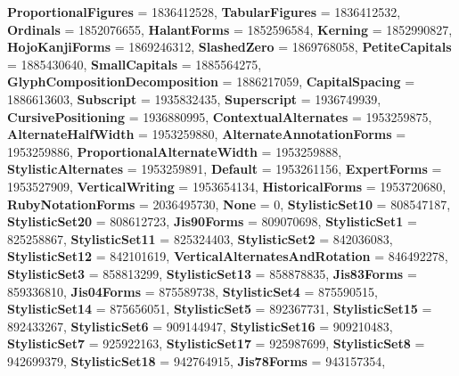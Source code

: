 \begin{DoxyCompactItemize}
{\bfseries Proportional\+Figures} = 1836412528, 
{\bfseries Tabular\+Figures} = 1836412532, 
{\bfseries Ordinals} = 1852076655, 
{\bfseries Halant\+Forms} = 1852596584, 
\newline
{\bfseries Kerning} = 1852990827, 
{\bfseries Hojo\+Kanji\+Forms} = 1869246312, 
{\bfseries Slashed\+Zero} = 1869768058, 
{\bfseries Petite\+Capitals} = 1885430640, 
\newline
{\bfseries Small\+Capitals} = 1885564275, 
{\bfseries Glyph\+Composition\+Decomposition} = 1886217059, 
{\bfseries Capital\+Spacing} = 1886613603, 
{\bfseries Subscript} = 1935832435, 
\newline
{\bfseries Superscript} = 1936749939, 
{\bfseries Cursive\+Positioning} = 1936880995, 
{\bfseries Contextual\+Alternates} = 1953259875, 
{\bfseries Alternate\+Half\+Width} = 1953259880, 
\newline
{\bfseries Alternate\+Annotation\+Forms} = 1953259886, 
{\bfseries Proportional\+Alternate\+Width} = 1953259888, 
{\bfseries Stylistic\+Alternates} = 1953259891, 
{\bfseries Default} = 1953261156, 
\newline
{\bfseries Expert\+Forms} = 1953527909, 
{\bfseries Vertical\+Writing} = 1953654134, 
{\bfseries Historical\+Forms} = 1953720680, 
{\bfseries Ruby\+Notation\+Forms} = 2036495730, 
\newline
{\bfseries None} = 0, 
{\bfseries Stylistic\+Set10} = 808547187, 
{\bfseries Stylistic\+Set20} = 808612723, 
{\bfseries Jis90\+Forms} = 809070698, 
\newline
{\bfseries Stylistic\+Set1} = 825258867, 
{\bfseries Stylistic\+Set11} = 825324403, 
{\bfseries Stylistic\+Set2} = 842036083, 
{\bfseries Stylistic\+Set12} = 842101619, 
\newline
{\bfseries Vertical\+Alternates\+And\+Rotation} = 846492278, 
{\bfseries Stylistic\+Set3} = 858813299, 
{\bfseries Stylistic\+Set13} = 858878835, 
{\bfseries Jis83\+Forms} = 859336810, 
\newline
{\bfseries Jis04\+Forms} = 875589738, 
{\bfseries Stylistic\+Set4} = 875590515, 
{\bfseries Stylistic\+Set14} = 875656051, 
{\bfseries Stylistic\+Set5} = 892367731, 
\newline
{\bfseries Stylistic\+Set15} = 892433267, 
{\bfseries Stylistic\+Set6} = 909144947, 
{\bfseries Stylistic\+Set16} = 909210483, 
{\bfseries Stylistic\+Set7} = 925922163, 
\newline
{\bfseries Stylistic\+Set17} = 925987699, 
{\bfseries Stylistic\+Set8} = 942699379, 
{\bfseries Stylistic\+Set18} = 942764915, 
{\bfseries Jis78\+Forms} = 943157354, 

\end{DoxyCompactItemize}
